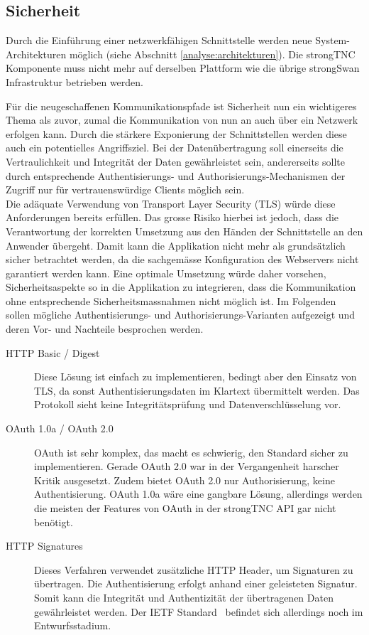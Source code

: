 \subsection{Sicherheit}

Durch die Einführung einer netzwerkfähigen Schnittstelle werden neue
System-Architekturen möglich (siehe Abschnitt \ref{analyse:architekturen}). Die
strongTNC Komponente muss nicht mehr auf derselben Plattform wie die übrige
strongSwan Infrastruktur betrieben werden.

Für die neugeschaffenen Kommunikationspfade ist Sicherheit nun ein wichtigeres
Thema als zuvor, zumal die Kommunikation von nun an auch über ein Netzwerk
erfolgen kann. Durch die stärkere Exponierung der Schnittstellen werden diese
auch ein potentielles Angriffsziel. Bei der Datenübertragung soll einerseits die
Vertraulichkeit und Integrität der Daten gewährleistet sein, andererseits sollte
durch entsprechende Authentisierungs- und Authorisierungs-Mechanismen der
Zugriff nur für vertrauenswürdige Clients möglich sein. \\ Die adäquate
Verwendung von Transport Layer Security (TLS) würde diese Anforderungen bereits
erfüllen.  Das grosse Risiko hierbei ist jedoch, dass die Verantwortung der
korrekten Umsetzung aus den Händen der Schnittstelle an den Anwender übergeht.
Damit kann die Applikation nicht mehr als grundsätzlich sicher betrachtet
werden, da die sachgemässe Konfiguration des Webservers nicht garantiert werden
kann\cite{owasp2013a5}. Eine optimale Umsetzung würde daher vorsehen,
Sicherheitsaspekte so in die Applikation zu integrieren, dass die Kommunikation
ohne entsprechende Sicherheitsmassnahmen nicht möglich ist. Im Folgenden sollen
mögliche Authentisierungs- und Authorisierungs-Varianten aufgezeigt und deren
Vor- und Nachteile besprochen werden.

\begin{description}

\item [HTTP Basic / Digest] Diese Lösung ist einfach zu implementieren, bedingt
aber den Einsatz von TLS, da sonst Authentisierungsdaten im Klartext übermittelt
werden. Das Protokoll sieht keine Integritätsprüfung und Datenverschlüsselung
vor.

\item [OAuth 1.0a / OAuth 2.0] OAuth ist sehr komplex, das macht es schwierig,
den Standard sicher zu implementieren. Gerade OAuth 2.0 war in der Vergangenheit
harscher Kritik ausgesetzt\cite{hammer2012, homakov2013}. Zudem bietet OAuth 2.0
nur Authorisierung, keine Authentisierung. OAuth 1.0a wäre eine gangbare Lösung,
allerdings werden die meisten der Features von OAuth in der strongTNC API gar
nicht benötigt.

\item [HTTP Signatures] Dieses Verfahren verwendet zusätzliche HTTP Header, um
Signaturen zu übertragen. Die Authentisierung erfolgt anhand einer geleisteten
Signatur. Somit kann die Integrität und Authentizität der übertragenen Daten
gewährleistet werden. Der IETF Standard~\cite{httpsignatures2014} befindet sich allerdings noch im
Entwurfsstadium.

\end{description}

